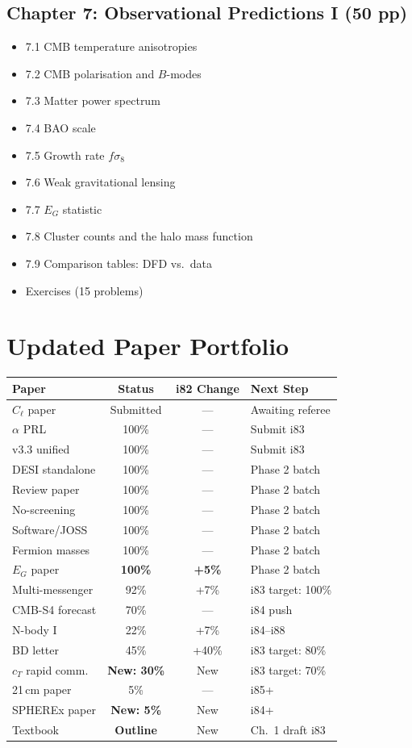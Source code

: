\documentclass[11pt,a4paper]{article}
\begin{document}
\subsection{Chapter 7: Observational Predictions I (50 pp)}
\begin{itemize}[nosep]
\item 7.1 CMB temperature anisotropies
\item 7.2 CMB polarisation and $B$-modes
\item 7.3 Matter power spectrum
\item 7.4 BAO scale
\item 7.5 Growth rate $f\sigma_8$
\item 7.6 Weak gravitational lensing
\item 7.7 $E_G$ statistic
\item 7.8 Cluster counts and the halo mass function
\item 7.9 Comparison tables: DFD vs.\ data
\item Exercises (15 problems)
\end{itemize}

\section{Updated Paper Portfolio}

\begin{center}
\begin{tabular}{lccl}
\toprule
\textbf{Paper} & \textbf{Status} & \textbf{i82 Change} & \textbf{Next Step} \\
\midrule
$C_\ell$ paper & Submitted & --- & Awaiting referee \\
$\alpha$ PRL & 100\% & --- & Submit i83 \\
v3.3 unified & 100\% & --- & Submit i83 \\
DESI standalone & 100\% & --- & Phase 2 batch \\
Review paper & 100\% & --- & Phase 2 batch \\
No-screening & 100\% & --- & Phase 2 batch \\
Software/JOSS & 100\% & --- & Phase 2 batch \\
Fermion masses & 100\% & --- & Phase 2 batch \\
$E_G$ paper & \textbf{100\%} & \textbf{+5\%} & Phase 2 batch \\
Multi-messenger & 92\% & +7\% & i83 target: 100\% \\
CMB-S4 forecast & 70\% & --- & i84 push \\
N-body I & 22\% & +7\% & i84--i88 \\
BD letter & 45\% & +40\% & i83 target: 80\% \\
$c_T$ rapid comm. & \textbf{New: 30\%} & New & i83 target: 70\% \\
21\,cm paper & 5\% & --- & i85+ \\
SPHEREx paper & \textbf{New: 5\%} & New & i84+ \\
Textbook & \textbf{Outline} & New & Ch.\ 1 draft i83 \\
\bottomrule
\end{tabular}
\end{center}
\end{document}
